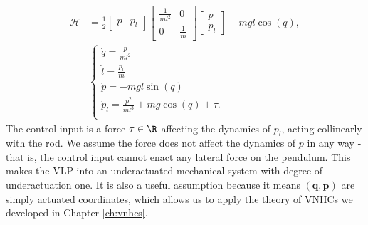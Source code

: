 \begin{align}\label{eqn:vlp-hamiltonian-with-pl}
   \mathcal{H} &= \frac{1}{2} \begin{bmatrix} p & p_l \end{bmatrix}
      \begin{bmatrix}
         \frac{1}{ml^2}  & 0 \\
         0 & \frac{1}{m}
      \end{bmatrix} \begin{bmatrix} p \\ p_l \end{bmatrix} - mgl\cos(q)
      , \\
     &\begin{cases}
        \dot{q} = \frac{p}{ml^2} \\
        \dot{l} = \frac{p_l}{m} \\
        \dot{p} = -mgl\sin(q) \\
        \dot{p}_l = \frac{p^2}{ml^3} + mg\cos(q) + \tau
        . \\
   \end{cases} \nonumber
\end{align}
The control input is a force \(\tau \in \R\) affecting the dynamics of
\(p_l\), acting collinearly with the rod.
We assume the force does not affect the dynamics of \(p\) in any way -
that is, the control input cannot enact any lateral force on the pendulum.
This makes the VLP into an underactuated mechanical system with degree of
underactuation one. 
It is also a useful assumption because it means \((\mathbf{q},\mathbf{p})\) 
are simply actuated coordinates, which allows us to apply the theory of VNHCs we
developed in Chapter \ref{ch:vnhcs}.

